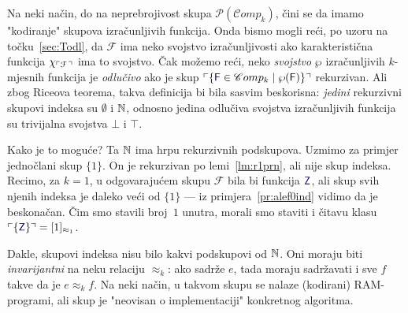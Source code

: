 Na neki način, do na neprebrojivost skupa $\mathcal P(\mathscr Comp_k)$, čini se da imamo "kodiranje" skupova izračunljivih funkcija. Onda bismo mogli reći, po uzoru na točku~\ref{sec:Todl}, da $\mathcal F$ ima neko svojstvo izračunljivosti ako karakteristična funkcija $\chi_{\ulcorner\mathcal F\,\urcorner}$ ima to svojstvo. Čak možemo reći, neko \emph{svojstvo} $\wp$ izračunljivih $k$-mjesnih funkcija je \emph{odlučivo} ako je skup $\kins{\{\f F\in\mathscr Comp_k\mid\wp(\f F)\}}$ rekurzivan. Ali zbog Riceova teorema, takva definicija bi bila sasvim beskorisna: \emph{jedini} rekurzivni skupovi indeksa su $\emptyset$ i ${\mathbb N}$, odnosno jedina odlučiva svojstva izračunljivih funkcija su trivijalna svojstva $\bot$ i $\top$.


Kako je to moguće? Ta ${\mathbb N}$ ima hrpu rekurzivnih podskupova. Uzmimo za primjer %
%
jednočlani skup $\{1\}$. On je rekurzivan po lemi~\ref{lm:r1prn}, ali nije skup indeksa. Recimo, za $k=1$, u odgovarajućem skupu $\mathcal F$ bila bi funkcija $\f Z$, ali skup svih njenih indeksa je daleko veći od $\{1\}$ --- iz primjera~\ref{pr:alef0ind} vidimo da je beskonačan. Čim smo stavili broj~$1$ unutra, morali smo staviti i čitavu klasu $\kins{\{\f Z\}}=[1]_{\approx_1}$.

Dakle, skupovi indeksa nisu bilo kakvi podskupovi od ${\mathbb N}$. Oni moraju biti \emph{invarijantni} na neku relaciju $\approx_k$: ako sadrže $e$, tada moraju sadržavati i sve $f$ takve da je $e\approx_k f$. Na neki način, u takvom skupu se nalaze (kodirani) RAM-programi, ali skup je "neovisan o implementaciji" konkretnog algoritma.

